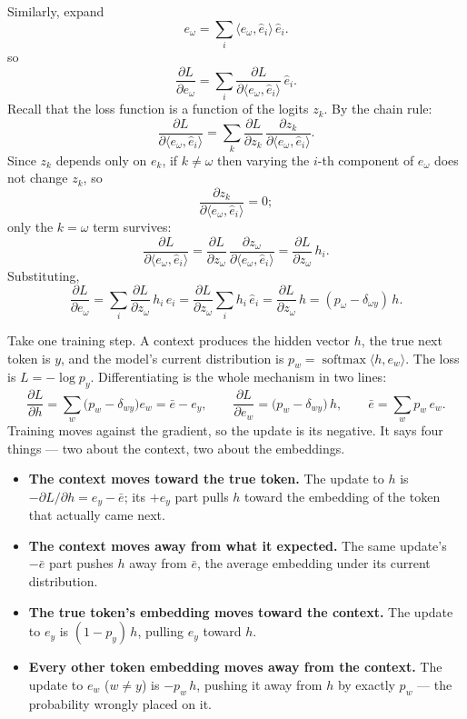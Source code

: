 \documentclass[11pt]{article}
\begin{document}
Similarly, expand
\[
  e_\omega = \sum_i \langle e_\omega, \hat{e}_i\rangle\,\hat{e}_i.
\]
so
\[
  \frac{\partial L}{\partial e_\omega}
    = \sum_i \frac{\partial L}{\partial \langle e_\omega, \hat{e}_i\rangle}\,\hat{e}_i .
\]
Recall that the loss function is a function of the logits $z_k$. By the chain rule:
\[
  \frac{\partial L}{\partial \langle e_\omega, \hat{e}_i\rangle}
    = \sum_k \frac{\partial L}{\partial z_k}\,\frac{\partial z_k}{\partial \langle e_\omega, \hat{e}_i\rangle}.
\]
Since $z_k$ depends only on $e_k$, if $k \neq \omega$ then varying the $i$-th component of
$e_\omega$ does not change $z_k$, so
\[
  \frac{\partial z_k}{\partial \langle e_\omega, \hat{e}_i\rangle} = 0 ;
\]
only the $k = \omega$ term survives:
\[
  \frac{\partial L}{\partial \langle e_\omega, \hat{e}_i\rangle}
    = \frac{\partial L}{\partial z_\omega}\,\frac{\partial z_\omega}{\partial \langle e_\omega, \hat{e}_i\rangle}
    = \frac{\partial L}{\partial z_\omega}\, h_i .
\]
Substituting,
\[
  \frac{\partial L}{\partial e_\omega}
    = \sum_i \frac{\partial L}{\partial z_\omega}\, h_i\,\hat{e}_i
    = \frac{\partial L}{\partial z_\omega}\sum_i h_i\,\hat{e}_i
    = \frac{\partial L}{\partial z_\omega}\, h
    = (p_\omega - \delta_{\omega y})\, h .
\]

\begin{tcolorbox}[colback=yellow!18, colframe=yellow!55!black, arc=2pt, boxrule=0.5pt,
  breakable, left=10pt, right=10pt, top=8pt, bottom=8pt]
Take one training step. A context produces the hidden vector $h$, the true next token is
$y$, and the model's current distribution is $p_w = \operatorname{softmax}\langle h, e_w\rangle$.
The loss is $L = -\log p_y$. Differentiating is the whole mechanism in two lines:
\[
  \frac{\partial L}{\partial h} = \sum_{w}\bigl(p_w - \delta_{wy}\bigr)e_w
    = \bar e - e_y,
  \qquad
  \frac{\partial L}{\partial e_w} = \bigl(p_w - \delta_{wy}\bigr)\,h,
  \qquad \bar e = \sum_w p_w\, e_w.
\]
Training moves against the gradient, so the update is its negative. It says four things ---
two about the context, two about the embeddings.
\begin{itemize}[leftmargin=1.4em]
  \item \textbf{The context moves toward the true token.} The update to $h$ is
  $-\partial L/\partial h = e_y - \bar e$; its $+e_y$ part pulls $h$ toward the embedding of
  the token that actually came next.
  \item \textbf{The context moves away from what it expected.} The same update's $-\bar e$
  part pushes $h$ away from $\bar e$, the average embedding under its current distribution.
  \item \textbf{The true token's embedding moves toward the context.} The update to $e_y$
  is $(1 - p_y)\,h$, pulling $e_y$ toward $h$.
  \item \textbf{Every other token embedding moves away from the context.} The update to $e_w$
  ($w \neq y$) is $-p_w\,h$, pushing it away from $h$ by exactly $p_w$ --- the probability
  wrongly placed on it.
\end{itemize}
\end{tcolorbox}
\end{document}
